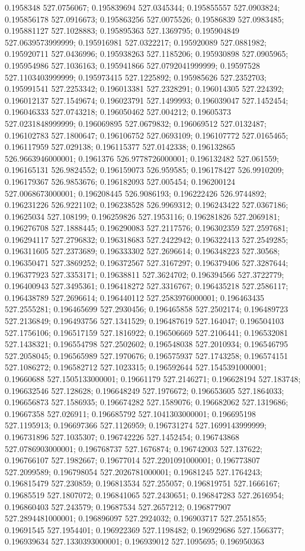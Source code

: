 0.1958348 527.0756067; 0.195839694 527.0345344; 0.195855557 527.0903824; 0.195856178 527.0916673; 0.195863256 527.0075526; 0.19586839 527.0983485; 0.195881127 527.1028883; 0.195895363 527.1369795; 0.195904849 527.0639573999999; 0.195916981 527.0322217; 0.195920089 527.0881982; 0.195920711 527.0436996; 0.195938263 527.1185206; 0.195930898 527.0905965; 0.195954986 527.1036163; 0.195941866 527.0792041999999; 0.19597528 527.1103403999999; 0.195973415 527.1225892; 0.195985626 527.2352703; 0.195991541 527.2253342; 0.196013381 527.2328291; 0.196014305 527.224392; 0.196012137 527.1549674; 0.196023791 527.1499993; 0.196039047 527.1452454; 0.196046333 527.0743218; 0.196050462 527.004212; 0.19605373 527.0231848999999; 0.196069895 527.0679832; 0.196069512 527.0132487; 0.196102783 527.1800647; 0.196106752 527.0693109; 0.196107772 527.0165465; 0.196117959 527.029138; 0.196115377 527.0142338; 0.196132865 526.9663946000001; 0.1961376 526.9778726000001; 0.196132482 527.061559; 0.196165131 526.9824552; 0.196159073 526.959585; 0.196178427 526.9910209; 0.196179367 526.9853676; 0.196182093 527.005454; 0.196200124 527.0068673000001; 0.196208445 526.9086193; 0.196222426 526.9744892; 0.196231226 526.9221102; 0.196238528 526.9969312; 0.196243422 527.0367186; 0.19625034 527.108199; 0.196259826 527.1953116; 0.196281826 527.2069181; 0.196276708 527.1888445; 0.196290083 527.2117576; 0.196302359 527.2597681; 0.196294117 527.2796832; 0.196318683 527.2422942; 0.196322413 527.2549285; 0.196311605 527.2373689; 0.196333302 527.2696614; 0.196348223 527.30568; 0.196350471 527.3869252; 0.196372567 527.3167297; 0.196379406 527.3287644; 0.196377923 527.3353171; 0.19638811 527.3624702; 0.196394566 527.3722779; 0.196400943 527.3495361; 0.196418272 527.3316767; 0.196435218 527.2586117; 0.196438789 527.2696614; 0.196440112 527.2583976000001; 0.196463435 527.2555281; 0.196465699 527.2930456; 0.196465858 527.2502174; 0.196489723 527.2136849; 0.196493756 527.1341529; 0.196487619 527.164047; 0.196504103 527.1756106; 0.196517159 527.1816922; 0.196506669 527.2106441; 0.196532081 527.1438321; 0.196554798 527.2502602; 0.196548038 527.2010934; 0.196546795 527.2058045; 0.196565989 527.1970676; 0.196575937 527.1743258; 0.196574151 527.1086272; 0.196582712 527.1023315; 0.196592644 527.1545391000001; 0.19660688 527.1505133000001; 0.19661179 527.2146271; 0.196628194 527.183748; 0.196632546 527.128628; 0.196648249 527.1976672; 0.196653605 527.1864033; 0.196656873 527.1586935; 0.196674282 527.1589076; 0.196682062 527.1319686; 0.19667358 527.026911; 0.196685792 527.1041303000001; 0.196695198 527.1195913; 0.196697366 527.1126959; 0.196731274 527.1699143999999; 0.196731896 527.1035307; 0.196742226 527.1452454; 0.196743868 527.0786903000001; 0.196768737 527.1676874; 0.196742003 527.137622; 0.196766107 527.1982667; 0.19677014 527.2201091000001; 0.196773807 527.2099589; 0.196798054 527.2026781000001; 0.19681245 527.1764243; 0.196815479 527.230859; 0.196813534 527.255057; 0.196819751 527.1666167; 0.19685519 527.1807072; 0.196841065 527.2430651; 0.196847283 527.2616954; 0.196860403 527.243579; 0.19687534 527.2657212; 0.196877907 527.2894481000001; 0.196896097 527.2924032; 0.196903717 527.2551855; 0.19691545 527.1954401; 0.196922369 527.1198482; 0.196929686 527.1566377; 0.196939634 527.1330393000001; 0.196939012 527.1095695; 0.196950363 